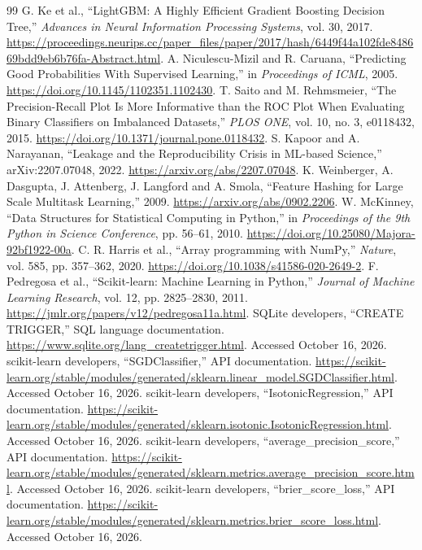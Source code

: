\documentclass[12pt,a4paper,oneside]{report}
\begin{document}
\begin{thebibliography}{99}
 G. Ke et al., ``LightGBM: A Highly Efficient Gradient Boosting Decision Tree,'' \emph{Advances in Neural Information Processing Systems}, vol. 30, 2017. \url{https://proceedings.neurips.cc/paper_files/paper/2017/hash/6449f44a102fde848669bdd9eb6b76fa-Abstract.html}.
 A. Niculescu-Mizil and R. Caruana, ``Predicting Good Probabilities With Supervised Learning,'' in \emph{Proceedings of ICML}, 2005. \url{https://doi.org/10.1145/1102351.1102430}.
 T. Saito and M. Rehmsmeier, ``The Precision-Recall Plot Is More Informative than the ROC Plot When Evaluating Binary Classifiers on Imbalanced Datasets,'' \emph{PLOS ONE}, vol. 10, no. 3, e0118432, 2015. \url{https://doi.org/10.1371/journal.pone.0118432}.
 S. Kapoor and A. Narayanan, ``Leakage and the Reproducibility Crisis in ML-based Science,'' arXiv:2207.07048, 2022. \url{https://arxiv.org/abs/2207.07048}.
 K. Weinberger, A. Dasgupta, J. Attenberg, J. Langford and A. Smola, ``Feature Hashing for Large Scale Multitask Learning,'' 2009. \url{https://arxiv.org/abs/0902.2206}.
 W. McKinney, ``Data Structures for Statistical Computing in Python,'' in \emph{Proceedings of the 9th Python in Science Conference}, pp. 56--61, 2010. \url{https://doi.org/10.25080/Majora-92bf1922-00a}.
 C. R. Harris et al., ``Array programming with NumPy,'' \emph{Nature}, vol. 585, pp. 357--362, 2020. \url{https://doi.org/10.1038/s41586-020-2649-2}.
 F. Pedregosa et al., ``Scikit-learn: Machine Learning in Python,'' \emph{Journal of Machine Learning Research}, vol. 12, pp. 2825--2830, 2011. \url{https://jmlr.org/papers/v12/pedregosa11a.html}.
 SQLite developers, ``CREATE TRIGGER,'' SQL language documentation. \url{https://www.sqlite.org/lang_createtrigger.html}. Accessed October 16, 2026.
 scikit-learn developers, ``SGDClassifier,'' API documentation. \url{https://scikit-learn.org/stable/modules/generated/sklearn.linear_model.SGDClassifier.html}. Accessed October 16, 2026.
 scikit-learn developers, ``IsotonicRegression,'' API documentation. \url{https://scikit-learn.org/stable/modules/generated/sklearn.isotonic.IsotonicRegression.html}. Accessed October 16, 2026.
 scikit-learn developers, ``average\_precision\_score,'' API documentation. \url{https://scikit-learn.org/stable/modules/generated/sklearn.metrics.average_precision_score.html}. Accessed October 16, 2026.
 scikit-learn developers, ``brier\_score\_loss,'' API documentation. \url{https://scikit-learn.org/stable/modules/generated/sklearn.metrics.brier_score_loss.html}. Accessed October 16, 2026.

\end{thebibliography}
\end{document}
